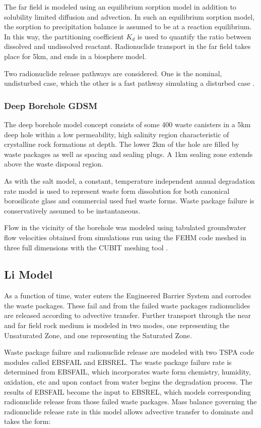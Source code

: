 {The far field is modeled using an equilibrium sorption model in addition 
to solubility limited diffusion and advection. In such an equilibrium sorption 
model, the sorption to precipitation balance is assumed to be at a 
reaction equilibrium. In this way, the partitioning coefficient $K_d$ is used to 
quantify the ratio between dissolved and undissolved reactant. Radionuclide transport
in the far field takes place for 5km, and ends in a biosphere model. 

Two radionuclide release pathways are considered. One is the nominal, undisturbed 
case, which the other is a fast pathway simulating a disturbed case
\cite{clayton_generic_2011}.


\subsubsection{ Deep Borehole GDSM}

The deep borehole model concept consists of some 400 waste canisters in a 5km 
deep hole within a low permeability, high salinity region characteristic of 
crystalline rock formations at depth. The lower 2km of the hole are filled 
by waste packages as well as spacing and sealing plugs. A 1km sealing zone 
extends above the waste disposal region.

As with the salt model, a constant, temperature independent annual degradation
rate model is used to represent waste form dissolution for both canonical 
borosilicate glass and commercial used fuel waste forms. Waste package failure 
is conservatively assumed to be instantaneous.

Flow in the vicinity of the borehole was modeled using tabulated groundwater 
flow velocities obtained from simulations run using the \gls{FEHM} code 
meshed in three full dimensions with the \gls{CUBIT} meshing tool 
\cite{clayton_generic_2011}.

\subsection{Li Model\cite{li_methodology_2006}} As a function of time, water
enters the Engineered Barrier System and corrodes the waste packages.  These
fail and from the failed waste packages radionuclides are released according to
advective transfer.  Further transport through the near and far field rock
medium is modeled in two modes, one representing the Unsaturated Zone, and one
representing the Saturated Zone.

Waste package failure and radionuclide release are modeled with two TSPA
code modules called EBSFAIL and EBSREL. The waste package failure rate is
determined from EBSFAIL, which incorporates waste form chemistry, humidity,
oxidation, etc and upon contact from water begins the degradation process. The
results of EBSFAIL become the input to EBSREL, which models corresponding
radionuclide release from those failed waste packages. Mass balance governing the
radionuclide release rate in this model allows advective transfer to dominate and
takes the form:

}
